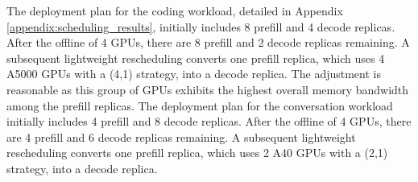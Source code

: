 The deployment plan for the coding workload, detailed in Appendix \ref{appendix:scheduling_results}, initially includes 8 prefill and 4 decode replicas. After the offline of 4 GPUs, there are 8 prefill and 2 decode replicas remaining. A subsequent lightweight rescheduling converts one prefill replica, which uses 4 A5000 GPUs with a (4,1) strategy, into a decode replica. The adjustment is reasonable as this group of GPUs exhibits the highest overall memory bandwidth among the prefill replicas. 
The deployment plan for the conversation workload initially includes 4 prefill and 8 decode replicas. After the offline of 4 GPUs, there are 4 prefill and 6 decode replicas remaining. A subsequent lightweight rescheduling converts one prefill replica, which uses 2 A40 GPUs with a (2,1) strategy, into a decode replica.

